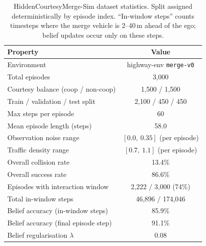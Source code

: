 \begin{table}[htbp]
\centering
\caption{HiddenCourtesyMerge-Sim dataset statistics.
  Split assigned deterministically by episode index.
  ``In-window steps'' counts timesteps where the merge vehicle is 2--40\,m
  ahead of the ego; belief updates occur only on these steps.}
\label{tab:dataset_stats}
\small
\begin{tabular}{lc}
\toprule
\textbf{Property} & \textbf{Value} \\
\midrule
Environment & highway-env \texttt{merge-v0} \\
Total episodes & 3{,}000 \\
Courtesy balance (coop / non-coop) & 1{,}500 / 1{,}500 \\
Train / validation / test split & 2{,}100 / 450 / 450 \\
Max steps per episode & 60 \\
Mean episode length (steps) & 58.0 \\
Observation noise range & $[0.0,\ 0.35]$ (per episode) \\
Traffic density range & $[0.7,\ 1.1]$ (per episode) \\
\midrule
Overall collision rate & 13.4\% \\
Overall success rate & 86.6\% \\
Episodes with interaction window & 2{,}222 / 3{,}000 (74\%) \\
Total in-window steps & 46{,}896 / 174{,}046 \\
\midrule
Belief accuracy (in-window steps) & 85.9\% \\
Belief accuracy (final episode step) & 91.1\% \\
Belief regularisation $\lambda$ & 0.08 \\
\bottomrule
\end{tabular}
\end{table}
